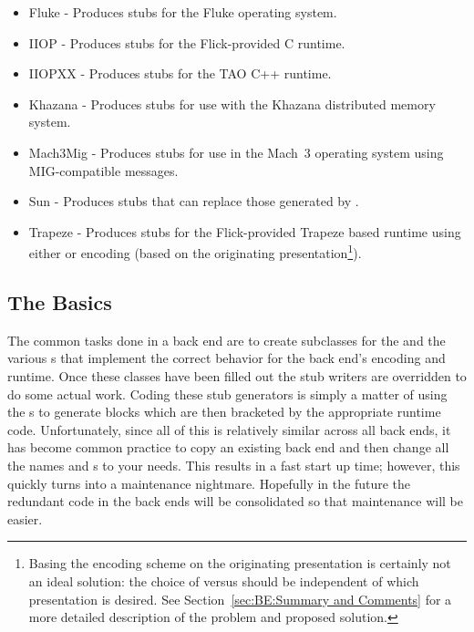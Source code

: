 \begin{itemize}
  \item Fluke - Produces stubs for the Fluke operating system.

  \item IIOP - Produces \CORBA{} \IIOP{} stubs for the Flick-provided C
  runtime.

  \item IIOPXX - Produces \CORBA{} \IIOP{} stubs for the TAO C++ runtime.

  \item Khazana - Produces stubs for use with the Khazana distributed memory
  system.

  \item Mach3Mig - Produces stubs for use in the Mach~3 operating system using
  MIG-compatible messages.

  \item Sun - Produces \ONCRPC{} stubs that can replace those generated by
  \rpcgen{}.

  \item Trapeze - Produces stubs for the Flick-provided Trapeze based runtime
  using either \XDR{} or \CDR{} encoding (based on the originating
  presentation\footnote{Basing the encoding scheme on the originating
  presentation is certainly not an ideal solution: the choice of \XDR{} versus
  \CDR{} should be independent of which presentation is desired.  See
  Section~\ref{sec:BE:Summary and Comments} for a more detailed description of
  the problem and proposed solution.}).
\end{itemize}

\subsection{The Basics}
\label{subsec:BE:The Basics}

The common tasks done in a back end are to create subclasses for the
 and the various s that implement the correct
behavior for the back end's encoding and runtime.  Once these classes have been
filled out the stub writers are overridden to do some actual work.  Coding
these stub generators is simply a matter of using the s to
generate \CAST{} blocks which are then bracketed by the appropriate runtime
code.  Unfortunately, since all of this is relatively similar across all back
ends, it has become common practice to copy an existing back end and then
change all the names and s to your needs.  This results in a
fast start up time; however, this quickly turns into a maintenance nightmare.
Hopefully in the future the redundant code in the back ends will be
consolidated so that maintenance will be easier.

